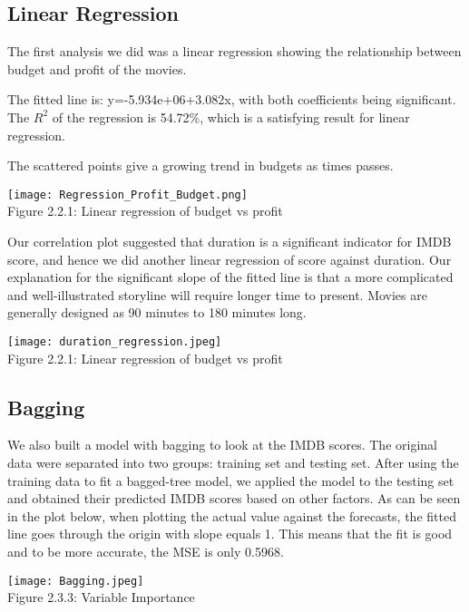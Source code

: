 \documentclass[12pt]{article}
\begin{document}
\begin{multicols}{2}
\subsection{Linear Regression}
\bigskip
The first analysis we did was a linear regression showing the relationship between budget and profit of the movies. \par 
The fitted line is: y=-5.934e+06+3.082x, with both coefficients being significant. 
The $R^2$ of the regression is 54.72\%, which is a satisfying result for linear regression.\par
The scattered points give a growing trend in budgets as times passes. 
\begin{center}
\texttt{[image: Regression\_Profit\_Budget.png]}\\
\footnotesize Figure 2.2.1: Linear regression of budget vs profit
\end{center}
\par
Our correlation plot suggested that duration is a significant indicator for IMDB score, and hence we did another linear regression of score against duration. Our explanation for the significant slope of the fitted line is that a more complicated and well-illustrated storyline will require longer time to present. Movies are generally designed as 90 minutes to 180 minutes long. 
\begin{center}
\texttt{[image: duration\_regression.jpeg]}\\
\footnotesize Figure 2.2.1: Linear regression of budget vs profit
\end{center}
\subsection{Bagging}
\bigskip
We also built a model with bagging to look at the IMDB scores. The original data were separated into two groups: training set and testing set. After using the training data to fit a bagged-tree model, we applied the model to the testing set and obtained their predicted IMDB scores based on other factors. As can be seen in the plot below, when plotting the actual value against the forecasts, the fitted line goes through the origin with slope equals 1. This means that the fit is good and to be more accurate, the MSE is only 0.5968. 

\begin{center}
\texttt{[image: Bagging.jpeg]}\\
\footnotesize Figure 2.3.3: Variable Importance
\end{center}


\end{multicols}
\end{document}
